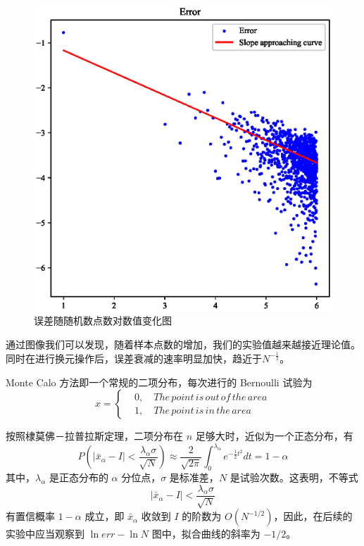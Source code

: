 \documentclass[12pt,a4paper]{article}%
\begin{document}
\begin{figure}[H]
\begin{minipage}{0.48\textwidth}
        \includegraphics[width=1.1\textwidth]{误差.eps}
        \caption{\fontsize{10pt}{15pt}\selectfont 误差随随机数点数对数值变化图}
    \end{minipage}\label{fig:figure2}
\end{figure}

通过图像我们可以发现，随着样本点数的增加，我们的实验值越来越接近理论值。同时在进行换元操作后，误差衰减的速率明显加快，趋近于$N^{-\frac{1}{2}}$。

Monte Calo 方法即一个常规的二项分布，每次进行的 Bernoulli 试验为
\begin{equation*}
    x =\left\{
    \begin{aligned}
        & 0, \quad The\, point\, is\, out\, of\, the\, area\\
        & 1, \quad The\, point\, is\, in\, the\, area
    \end{aligned}
    \right.
\end{equation*}

按照棣莫佛－拉普拉斯定理，二项分布在 \(n\) 足够大时，近似为一个正态分布，有
\begin{equation*}
    P(\left| \bar{x}_\alpha - I \right| < \frac{\lambda_\alpha \sigma}{\sqrt {N}}) \approx \frac{2}{\sqrt{2 \pi}} \int^{\lambda_\alpha}_0 e^{-\frac{1}{2} t^2} dt = 1 - \alpha
\end{equation*}
其中，\(\lambda_\alpha\) 是正态分布的 \(\alpha\) 分位点，\(\sigma\) 是标准差，\(N\) 是试验次数。这表明，不等式
\begin{equation*}
    \left| \bar{x}_\alpha - I \right| < \frac{\lambda_\alpha \sigma}{\sqrt {N}}
\end{equation*}
有置信概率 \(1 - \alpha\) 成立，即 \(\bar{x}_\alpha\) 收敛到 \(I\) 的阶数为 \(O (N^{-1 / 2})\)，因此，在后续的实验中应当观察到 \(\ln err - \ln N\) 图中，拟合曲线的斜率为 \(- 1 / 2\)。
\end{document}
